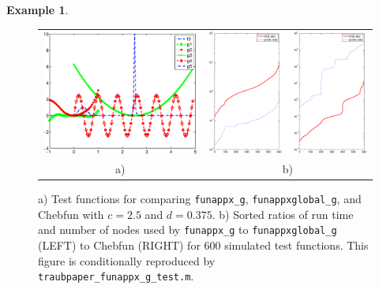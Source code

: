 \documentclass[review]{elsarticle}
\theoremstyle{definition}
\newtheorem{exmp}{Example}
\newcommand{\funappxg}{\texttt{funappx\_g\xspace}}
\newcommand{\funappxglobalg}{\texttt{funappxglobal\_g\xspace}}
\begin{document}
\begin{exmp}
%
\begin{figure}[th]
  \centering
  \begin{tabular}{cc}
\includegraphics[width=58mm]{figure/traub_funappxNoPenalty_g_testfun.eps} & \hspace{-3ex}
\includegraphics[width=60mm]{figure/traub_funappxNoPenalty_g_test.eps}
  \\ a)  & b)
  \end{tabular}
\caption{a) Test functions for comparing \funappxg, \funappxglobalg, and Chebfun
with $c=2.5$ and $d=0.375$. b) Sorted ratios of run time and number of nodes
used by \funappxg{} to \funappxglobalg{} (LEFT) to Chebfun (RIGHT) for 600 simulated test
functions. This figure is conditionally reproduced by
\texttt{traubpaper\_funappx\_g\_test.m}.}
  \label{fig:testfunctions}
\end{figure}


\end{exmp}
\end{document}
